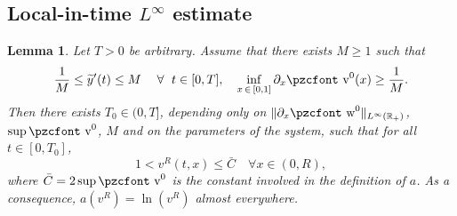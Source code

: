 \documentclass[10pt]{amsart}
\newtheorem{lemm}[theo]{Lemma}\newtheorem{prop}[theo]{Proposition}\newtheorem{coro}[theo]{Corollary}\newtheorem{conj}[theo]{Conjecture}
\theoremstyle{definition}\newtheorem{defi}[theo]{Definition}\newtheorem{rema}[theo]{Remark}\newtheorem{exam}[theo]{Example}\newtheorem{exem}[theo]{Example}\newtheorem{nota}[theo]{Notation}
\newcommand{\mathpzc}[1]{\text{\pzcfont #1}}
\newcommand{\R}{\mathbb{R}}
\newcommand{\p}{\partial}
\newcommand{\tv}{\mathpzc{v}}
\newcommand{\tw}{\mathpzc{w}}
\newcommand{\ty}{\widetilde{y}}
\let\oldforall\forall
\renewcommand*{\forall}{\mathrel{\oldforall}}
\begin{document}
\subsection{Local-in-time \texorpdfstring{$L^\infty$}{Linfty} estimate}

\begin{lemm}\label{lem:infty-est}
Let $T>0$ be arbitrary. Assume that there exists $M\geq 1$ such that
\begin{equation}\label{hyp:M}
\frac{1}{M} \leq \ty'(t)\leq M \quad \forall \ t \in [0,T],\quad \inf_{x\,\in\,[0,1]}\p_x \tv^0(x) \geq \frac{1}{M}.
\end{equation}
Then there exists $T_0\in (0,T]$, depending only on $\|\p_x \tw^0\|_{L^\infty(\R_+)}$, $\sup \tv^0$, $M$ and on the parameters of the system, such that for all $t\in [0,T_0]$,
\begin{equation}
1 < v^R(t,x) \leq \bar C\quad \forall x \in (0,R),
\end{equation}
where $\bar C = 2 \sup \tv^0 $ is the constant involved in the definition of $a$. As a consequence, $a(v^R)= \ln (v^R)$ almost everywhere.
\end{lemm}
\end{document}
